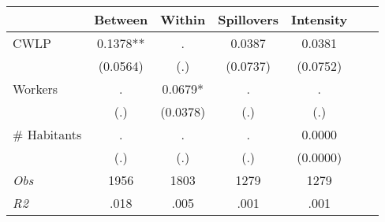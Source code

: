 \begin{tabular}{l*{6}{c}}\hline&\multicolumn{1}{c}{Between}&\multicolumn{1}{c}{Within}&\multicolumn{1}{c}{Spillovers}&\multicolumn{1}{c}{Intensity}\\ \hline 
CWLP & 0.1378** & . & 0.0387 & 0.0381 \\
 & (0.0564) & (.) & (0.0737) & (0.0752) \\
Workers & . & 0.0679* & . & . \\
 & (.) & (0.0378) & (.) & (.) \\
\# Habitants & . & . & . & 0.0000 \\
  & (.) & (.) & (.) & (0.0000) \\
\hline \textit{Obs} & 1956 & 1803 & 1279 & 1279  \\ \textit{R2} & .018 & .005 & .001 & .001 \\ \hline \end{tabular}
